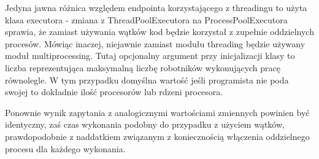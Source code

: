Jedyna jawna różnica względem endpointa korzystającego z threadingu to użyta klasa executora - zmiana z ThreadPoolExecutora na ProcessPoolExecutora sprawia, że zamiast używania wątków kod będzie korzystał z zupełnie oddzielnych procesów. Mówiąc inaczej, niejawnie zamiast modułu threading będzie używany moduł multiprocessing. Tutaj opcjonalny argument przy inicjalizacji klasy to liczba reprezentująca maksymalną liczbę robotników wykonujących pracę równolegle. W tym przypadku domyślna wartość jeśli programista nie poda swojej to dokładnie ilość procesorów lub rdzeni procesora.

Ponownie wynik zapytania z analogicznymi wartościami zmiennych powinien być identyczny, zaś czas wykonania podobny do przypadku z użyciem wątków, prawdopodobnie z naddatkiem związanym z koniecznością włączenia oddzielnego procesu dla każdego wykonania.